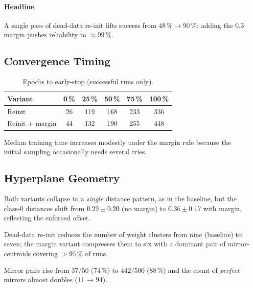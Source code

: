 \paragraph{Headline}
A single pass of dead-data re-init lifts success from
$48\,\%\!\to\!90\,\%$;
adding the $0.3$ margin pushes reliability to \(\approx99\,\%\).

\subsection*{Convergence Timing}

\begin{table}[h]
\centering
\caption{Epochs to early-stop (successful runs only).}
\label{tab:relu1-reinit-epochs}
\begin{tabular}{lccccc}
\toprule
Variant & 0\,\% & 25\,\% & 50\,\% & 75\,\% & 100\,\% \\
\midrule
Reinit            & 26 & 119 & 168 & 233 & 336 \\
Reinit + margin   & 44 & 132 & 190 & 255 & 448 \\
\bottomrule
\end{tabular}
\end{table}

Median training time increases modestly under the margin rule because
the initial sampling occasionally needs several tries.

\subsection*{Hyperplane Geometry}

\begin{description}[leftmargin=2em]
  \item[Distance clusters] Both variants collapse to a \emph{single}
        distance pattern, as in the baseline, but the class-0 distances
        shift from \(0.29\pm0.20\) (no margin) to
        \(0.36\pm0.17\) with margin, reflecting the enforced offset.%
        
  \item[Weight clusters] Dead-data re-init reduces the number of weight
        clusters from nine (baseline) to seven; the margin variant
        compresses them to six with a dominant pair of mirror-centroids
        covering $>95\,\%$ of runs.%
  \item[Mirror symmetry] Mirror pairs rise from
        $37/50$ (74\,\%) to $442/500$ (88\,\%) and the count of
        \emph{perfect} mirrors almost doubles
        (11 → 94).%
\end{description}

